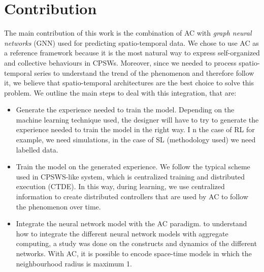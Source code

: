 \documentclass{article}
\begin{document}
\section{Contribution}
The main contribution of this work is the combination of AC with \textit{graph neural networks} (GNN) used for predicting spatio-temporal data. 
We chose to use AC as a reference framework because it is the most natural way to express self-organized and collective behaviours in CPSWs. 
Moreover, since we needed to process spatio-temporal series to understand the trend of the phenomenon and therefore follow it, we believe that spatio-temporal architectures are the best choice to solve this problem.
We outline the main steps to deal with this integration, that are:
 \begin{itemize}
\item Generate the experience needed to train the model. 
 Depending on the machine learning technique used, 
 the designer will have to try to generate the experience needed to train the model in the right way. I
 n the case of RL for example, we need simulations, in the case of SL (methodology used) we need labelled data.
\item Train the model on the generated experience. We follow the typical scheme used in CPSWS-like system, which is centralized training and distributed execution (CTDE). 
In this way, during learning, we use centralized information to create distributed controllers that are used by AC to 
follow the phenomenon over time.
\item Integrate the neural network model with the AC paradigm. to understand how to integrate the different neural network models with aggregate computing, a study was done on the constructs and dynamics of the different networks. With AC, it is possible to encode space-time models in which the neighbourhood radius is maximum 1.
\end{itemize}
\end{document}
